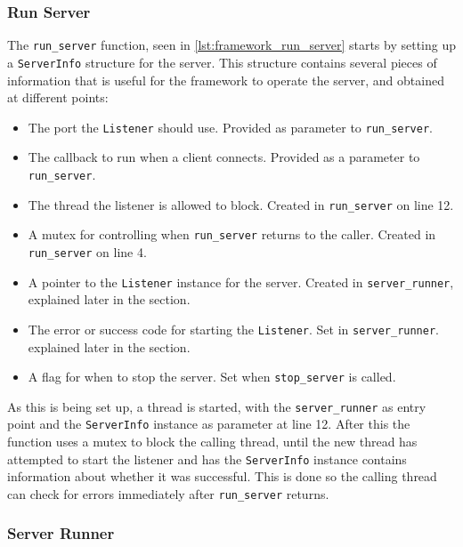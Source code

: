 \subsubsection{Run Server}
The \lstinline|run_server| function, seen in \autoref{lst:framework_run_server} starts by setting up a \lstinline|ServerInfo| structure for the server. This structure contains several
pieces of information that is useful for the framework to operate the server, and obtained at different points:
\begin{itemize}
\item The port the \lstinline|Listener| should use. Provided as parameter to \lstinline|run_server|.
\item The callback to run when a client connects. Provided as a parameter to \lstinline|run_server|.
\item The thread the listener is allowed to block. Created in \lstinline|run_server| on line 12.
\item A mutex for controlling when \lstinline|run_server| returns to the caller. Created in \lstinline|run_server| on line 4.
\item A pointer to the \lstinline|Listener| instance for the server. Created in \lstinline|server_runner|, explained later in the section.
\item The error or success code for starting the \lstinline|Listener|. Set in \lstinline|server_runner|. explained later in the section.
\item A flag for when to stop the server. Set when \lstinline|stop_server| is called.
\end{itemize}
As this is being set up, a thread is started, with the \lstinline|server_runner| as entry point and the \lstinline|ServerInfo| instance as parameter at line 12. After this the function uses a mutex
to block the calling thread, until the new thread has attempted to start the listener and has the \lstinline|ServerInfo| instance contains information about whether it was successful.
This is done so the calling thread can check for errors immediately after \lstinline|run_server| returns.


\subsubsection{Server Runner}

